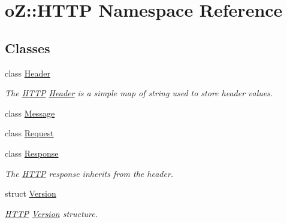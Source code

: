 \hypertarget{namespaceo_z_1_1_h_t_t_p}{}\section{oZ\+::H\+T\+TP Namespace Reference}
\label{namespaceo_z_1_1_h_t_t_p}
\subsection*{Classes}
\begin{DoxyCompactItemize}
\item 
class \mbox{\hyperlink{classo_z_1_1_h_t_t_p_1_1_header}{Header}}
\begin{DoxyCompactList}\small\item\em The \mbox{\hyperlink{namespaceo_z_1_1_h_t_t_p}{H\+T\+TP}} \mbox{\hyperlink{classo_z_1_1_h_t_t_p_1_1_header}{Header}} is a simple map of string used to store header values. \end{DoxyCompactList}\item 
class \mbox{\hyperlink{classo_z_1_1_h_t_t_p_1_1_message}{Message}}
\item 
class \mbox{\hyperlink{classo_z_1_1_h_t_t_p_1_1_request}{Request}}
\item 
class \mbox{\hyperlink{classo_z_1_1_h_t_t_p_1_1_response}{Response}}
\begin{DoxyCompactList}\small\item\em The \mbox{\hyperlink{namespaceo_z_1_1_h_t_t_p}{H\+T\+TP}} response inherits from the header. \end{DoxyCompactList}\item 
struct \mbox{\hyperlink{structo_z_1_1_h_t_t_p_1_1_version}{Version}}
\begin{DoxyCompactList}\small\item\em \mbox{\hyperlink{namespaceo_z_1_1_h_t_t_p}{H\+T\+TP}} \mbox{\hyperlink{structo_z_1_1_h_t_t_p_1_1_version}{Version}} structure. \end{DoxyCompactList}\end{DoxyCompactItemize}

